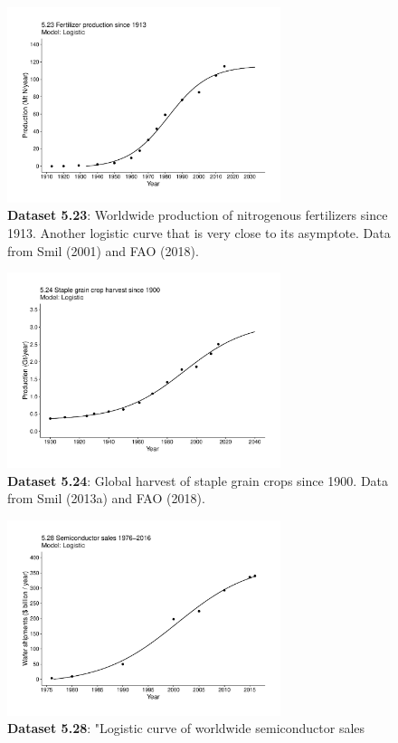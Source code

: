 \documentclass[aps,rmp,preprint,superscriptaddress,10pt,onecolumn]{article}
\begin{document}
\begin{figure}[h]
\includegraphics[width=8cm]{output/figs-ggplot/5.23.pdf}
\caption{\textbf{Dataset 5.23}: Worldwide production of nitrogenous fertilizers since 1913. Another logistic curve that is very close to its asymptote. Data from Smil (2001) and FAO (2018).}
\end{figure}
	
\begin{figure}[h]
\includegraphics[width=8cm]{output/figs-ggplot/5.24.pdf}
\caption{\textbf{Dataset 5.24}: Global harvest of staple grain crops since 1900. Data from Smil (2013a) and FAO (2018).}
\end{figure}
	
\begin{figure}[h]
\includegraphics[width=8cm]{output/figs-ggplot/5.28.pdf}
\caption{\textbf{Dataset 5.28}: "Logistic curve of worldwide semiconductor sales}
\end{figure}
	
\end{document}
